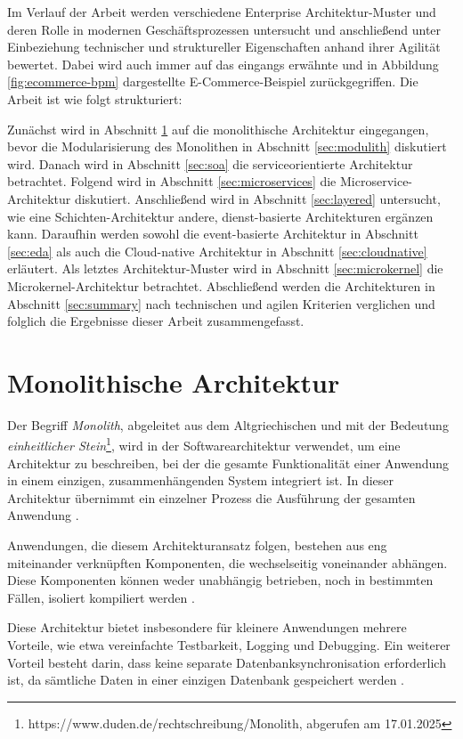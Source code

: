 \documentclass[acmtog]{acmart}
\begin{document}
Im Verlauf der Arbeit werden verschiedene Enterprise Architektur-Muster und deren Rolle in modernen Geschäftsprozessen untersucht
und anschließend unter Einbeziehung technischer und struktureller Eigenschaften anhand ihrer Agilität bewertet.
Dabei wird auch immer auf das eingangs erwähnte und in Abbildung \ref{fig:ecommerce-bpm} dargestellte E-Commerce-Beispiel zurückgegriffen.
Die Arbeit ist wie folgt strukturiert:

Zunächst wird in Abschnitt \ref{sec:monolith} auf die monolithische Architektur eingegangen, bevor die Modularisierung des Monolithen in Abschnitt \ref{sec:modulith} diskutiert wird.
Danach wird in Abschnitt \ref{sec:soa} die serviceorientierte Architektur betrachtet.
Folgend wird in Abschnitt \ref{sec:microservices} die Microservice-Architektur diskutiert.
Anschließend wird in Abschnitt \ref{sec:layered} untersucht, wie eine Schichten-Architektur andere, dienst-basierte Architekturen ergänzen kann.
Daraufhin werden sowohl die event-basierte Architektur in Abschnitt \ref{sec:eda} als auch die Cloud-native Architektur in Abschnitt \ref{sec:cloudnative} erläutert.
Als letztes Architektur-Muster wird in Abschnitt \ref{sec:microkernel} die Microkernel-Architektur betrachtet.
Abschließend werden die Architekturen in Abschnitt \ref{sec:summary} nach technischen und agilen Kriterien verglichen und folglich die Ergebnisse dieser Arbeit zusammengefasst.

\section{Monolithische Architektur}
\label{sec:monolith}
Der Begriff \textit{Monolith}, abgeleitet aus dem Altgriechischen und mit der Bedeutung
\textit{einheitlicher Stein}\footnote{https://www.duden.de/rechtschreibung/Monolith, abgerufen am 17.01.2025},
wird in der Softwarearchitektur verwendet, um eine Architektur zu beschreiben, bei der die gesamte Funktionalität
einer Anwendung in einem einzigen, zusammenhängenden System integriert ist.
In dieser Architektur übernimmt ein einzelner Prozess die Ausführung der gesamten Anwendung \cite[1]{mono}.

Anwendungen, die diesem Architekturansatz folgen, bestehen aus eng miteinander verknüpften
Komponenten, die wechselseitig voneinander abhängen.
Diese Komponenten können weder unabhängig betrieben, noch in bestimmten Fällen,
isoliert kompiliert werden \cite[485]{mono3}.

Diese Architektur bietet insbesondere für kleinere Anwendungen mehrere Vorteile,
wie etwa vereinfachte Testbarkeit, Logging und Debugging. Ein
weiterer Vorteil besteht darin, dass keine separate Datenbanksynchronisation
erforderlich ist, da sämtliche Daten in einer einzigen Datenbank gespeichert
werden \cite[20358]{mono4}.
\end{document}
